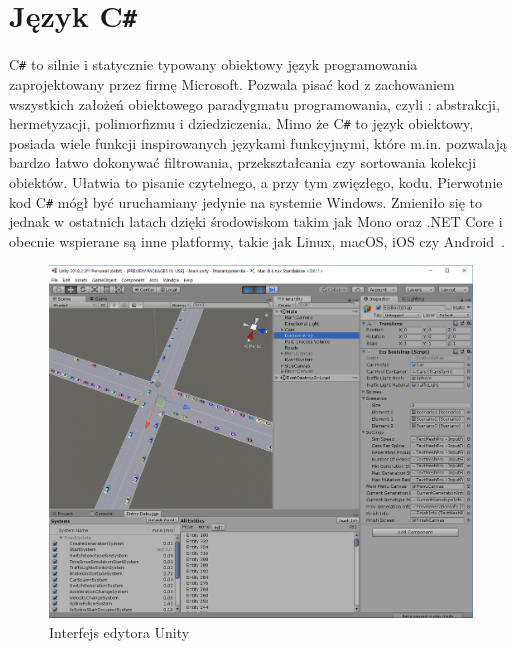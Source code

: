 \section*{Język C\texttt{\#}}
C\texttt{\#} to silnie i statycznie typowany obiektowy język programowania zaprojektowany przez firmę Microsoft. Pozwala pisać kod z zachowaniem wszystkich założeń obiektowego paradygmatu programowania, czyli : abstrakcji, hermetyzacji, polimorfizmu i dziedziczenia. Mimo że C\texttt{\#} to język obiektowy, posiada wiele funkcji inspirowanych językami funkcyjnymi, które m.in. pozwalają bardzo łatwo dokonywać filtrowania, przekształcania czy sortowania kolekcji obiektów. Ułatwia to pisanie czytelnego, a przy tym zwięzłego, kodu. Pierwotnie kod C\texttt{\#} mógł być uruchamiany jedynie na systemie Windows. Zmieniło się to jednak w ostatnich latach dzięki środowiskom takim jak Mono oraz .NET Core i obecnie wspierane są inne platformy, takie jak Linux, macOS, iOS czy Android~\cite{Albahari2017}.
\begin{figure}[h!]
	\centering
	\includegraphics[width=1\linewidth]{unity}
	\caption[Interfejs edytora Unity]{Interfejs edytora Unity}
	\label{fig:unity}
\end{figure}
